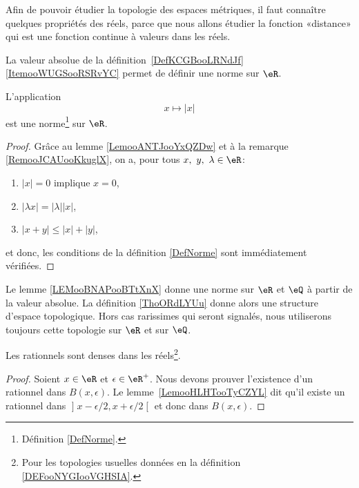 Afin de pouvoir étudier la topologie des espaces métriques, il faut connaître quelques propriétés des réels, parce que nous allons étudier la fonction «distance» qui est une fonction continue à valeurs dans les réels.

La valeur absolue de la définition~\ref{DefKCGBooLRNdJf}\ref{ItemooWUGSooRSRvYC} permet de définir une norme sur \( \eR\).
\begin{lemma}       \label{LEMooBNAPooBTtXnX}
	L'application
	\begin{equation}
		x\mapsto | x |
	\end{equation}
	est une norme\footnote{Définition \ref{DefNorme}.} sur \( \eR\).
\end{lemma}

\begin{proof}
	Grâce au lemme \ref{LemooANTJooYxQZDw} et à la remarque \ref{RemooJCAUooKkuglX}, on a, pour tous \(x,\ y,\ \lambda \in \eR \):
	\begin{enumerate}
		\item \( | x |=0\) implique \( x=0\),
		\item \( | \lambda x |=| \lambda | |x |\),
		\item \( | x+y |\leq | x |+| y |\),
	\end{enumerate}
	et donc, les conditions de la définition \ref{DefNorme} sont immédiatement vérifiées.
\end{proof}

\begin{definition}      \label{DEFooNYGIooVGHSIA}
	Le lemme \ref{LEMooBNAPooBTtXnX} donne une norme sur \( \eR\) et \( \eQ\) à partir de la valeur absolue. La définition \ref{ThoORdLYUu} donne alors une structure d'espace topologique. Hors cas rarissimes qui seront signalés, nous utiliserons toujours cette topologie sur \( \eR\) et sur \( \eQ\).
\end{definition}

\begin{proposition}     \label{PropooUHNZooOUYIkn}
	Les rationnels sont denses dans les réels\footnote{Pour les topologies usuelles données en la définition \ref{DEFooNYGIooVGHSIA}.}.
\end{proposition}

\begin{proof}
	Soient \( x\in \eR\) et \( \epsilon\in \eR^+\). Nous devons prouver l'existence d'un rationnel dans \( B(x,\epsilon)\). Le lemme~\ref{LemooHLHTooTyCZYL} dit qu'il existe un rationnel dans \( \mathopen] x-\epsilon/2 , x+\epsilon/2 \mathclose[\) et donc dans \( B(x,\epsilon)\).
\end{proof}

